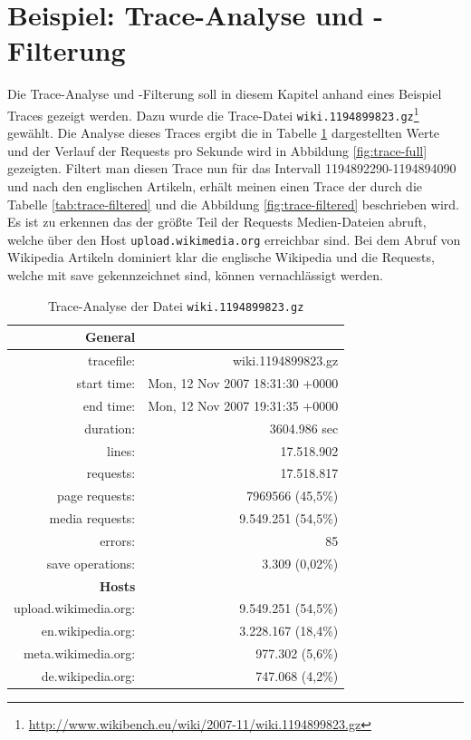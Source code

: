 \section{Beispiel: Trace-Analyse und -Filterung}
\label{sec:beispiel}

Die Trace-Analyse und -Filterung soll in diesem Kapitel anhand eines Beispiel Traces gezeigt werden. Dazu wurde die Trace-Datei \texttt{wiki.1194899823.gz}\footnote{\url{http://www.wikibench.eu/wiki/2007-11/wiki.1194899823.gz}} gewählt. Die Analyse dieses Traces ergibt die in Tabelle \ref{tab:trace-full} dargestellten Werte und der Verlauf der Requests pro Sekunde wird in Abbildung \ref{fig:trace-full} gezeigten. Filtert man diesen Trace nun für das Intervall 1194892290-1194894090 und nach den englischen Artikeln, erhält meinen einen Trace der durch die Tabelle \ref{tab:trace-filtered} und die Abbildung \ref{fig:trace-filtered} beschrieben wird. Es ist zu erkennen das der größte Teil der Requests Medien-Dateien abruft, welche über den Host \texttt{upload.wikimedia.org} erreichbar sind. Bei dem Abruf von Wikipedia Artikeln dominiert klar die englische Wikipedia und die Requests, welche mit \glqq{}save\grqq{} gekennzeichnet sind, können vernachlässigt werden.

\begin{table}
  \centering
  \begin{tabular}{|rr|}\hline
    \textbf{General} & \\\hline
    tracefile: & wiki.1194899823.gz \\
    start time: & Mon, 12 Nov 2007 18:31:30 +0000 \\
    end time: & Mon, 12 Nov 2007 19:31:35 +0000 \\
    duration: & 3604.986 sec \\
    lines: & 17.518.902 \\
    requests: & 17.518.817 \\
    page requests: & 7969566 (45,5\%) \\
    media requests: & 9.549.251 (54,5\%) \\
    errors: & 85 \\
    save operations: & 3.309 (0,02\%)\\\hline\hline
    \textbf{Hosts} & \\\hline
    upload.wikimedia.org: & 9.549.251 (54,5\%) \\
    en.wikipedia.org:&  3.228.167 (18,4\%) \\
    meta.wikimedia.org: &  977.302 (5,6\%) \\
    de.wikipedia.org:  & 747.068 (4,2\%)\\\hline
  \end{tabular}
  \caption{Trace-Analyse der Datei \texttt{wiki.1194899823.gz}}
  \label{tab:trace-full}
\end{table}

